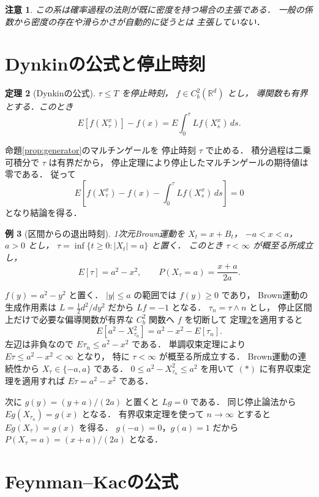 \documentclass[a5paper,10pt,onecolumn]{jsarticle}
\makeatletter
\theoremstyle{mathnotetheorem}
\newtheorem{theorem}{定理}[section]
\newtheorem{example}[theorem]{例}
\newtheorem{remark}[theorem]{注意}
\renewcommand{\proofname}{証明}
\renewenvironment{proof}[1][\proofname]{%
  \par\pushQED{\qed}\normalfont\topsep4\p@\@plus2\p@\relax
  \trivlist\item[\hskip\labelsep\bfseries #1]\ignorespaces
}{\popQED\endtrivlist\@endpefalse}
\makeatother
\begin{document}
\begin{remark}
この系は確率過程の法則が既に密度を持つ場合の主張である．
一般の係数から密度の存在や滑らかさが自動的に従うとは
主張していない．
\end{remark}

\section{Dynkinの公式と停止時刻}

\begin{theorem}[Dynkinの公式]\label{thm:dynkin}
$\tau\le T$ を停止時刻，
$f\in C_b^2(\mathbb R^d)$ とし，
導関数も有界とする．このとき
\[
 E[f(X_\tau^x)]-f(x)
 =E\int_0^\tau Lf(X_s^x)\,ds.
\]
\end{theorem}
\begin{proof}
命題\ref{prop:generator}のマルチンゲールを
停止時刻 $\tau$ で止める．
積分過程は二乗可積分で $\tau$ は有界だから，
停止定理により停止したマルチンゲールの期待値は零である．
従って
\[
 E\left[
 f(X_\tau^x)-f(x)-\int_0^\tau Lf(X_s^x)\,ds
 \right]=0
\]
となり結論を得る．
\end{proof}

\begin{example}[区間からの退出時刻]\label{ex:exit}
1次元Brown運動を $X_t=x+B_t$，
$-a<x<a$，$a>0$ とし，
$\tau=\inf\{t\ge0:|X_t|=a\}$ と置く．
このとき $\tau<\infty$ が概至る所成立し，
\[
 E[\tau]=a^2-x^2,\qquad
 P(X_\tau=a)=\frac{x+a}{2a}.
\]
\end{example}
\begin{proof}
$f(y)=a^2-y^2$ と置く．
$|y|\le a$ の範囲では $f(y)\ge0$ であり，
Brown運動の生成作用素は $L=\frac12d^2/dy^2$
だから $Lf=-1$ となる．
$\tau_n=\tau\wedge n$ とし，
停止区間上だけで必要な偏導関数が有界な
$C_b^2$ 関数へ $f$ を切断して
定理\ref{thm:dynkin}を適用すると
\[
 E[a^2-X_{\tau_n}^2]
 =a^2-x^2-E[\tau_n].
 \tag{$*$}
\]
左辺は非負なので $E\tau_n\le a^2-x^2$ である．
単調収束定理により
$E\tau\le a^2-x^2<\infty$ となり，
特に $\tau<\infty$ が概至る所成立する．
Brown運動の連続性から $X_\tau\in\{-a,a\}$ である．
$0\le a^2-X_{\tau_n}^2\le a^2$ を用いて
$(*)$ に有界収束定理を適用すれば
$E\tau=a^2-x^2$ である．

次に $g(y)=(y+a)/(2a)$ と置くと $Lg=0$ である．
同じ停止論法から
$Eg(X_{\tau_n})=g(x)$ となる．
有界収束定理を使って $n\to\infty$ とすると
$Eg(X_\tau)=g(x)$ を得る．
$g(-a)=0$，$g(a)=1$ だから
$P(X_\tau=a)=(x+a)/(2a)$ となる．
\end{proof}

\section{Feynman--Kacの公式}
\end{document}
